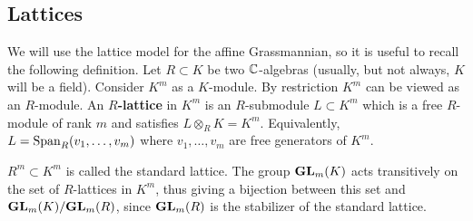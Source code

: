 \documentclass[draft]{article}
\begin{document}
\subsection{Lattices}
\label{ss:lat}
We will use the lattice model for the affine Grassmannian, so it is useful to recall the following definition. Let $ R \subset K$ be two $\mathbb C$-algebras (usually, but not always, $K$ will be a field). 
Consider $ K^m $ as a $K$-module. 
By restriction $ K^m$ can be viewed as an $R$-module.  An \textbf{$R$-lattice} in $K^m$ 
is an $R$-submodule $ L \subset K^m$ 
which is a free $R$-module of rank $ m $ and satisfies $ L \otimes_R K = K^m $. Equivalently, $ L = \operatorname{Span}_R(v_1, \dots, v_m)$ where $v_1, \dots, v_m$ are free generators of $K^m$. 
% 
\begin{comment}
\jcom{Maybe need that both $K$ and $R$ are integral domains and have the same field of fractions?} 
\acom{Roger has proved that what is written is ok.}
\rcom{Here's my argument: If $L \subset K^m$ is a free rank $m$ $R$-module and $L \otimes K = K^m$, then it's clear we that $L$ is generated by $m$ generators $v_1,\dots,v_m$ over $R$. Since $L\otimes K = K^m$, these also generate $K^m$ over $K$. Then we have a surjective map $K^m \twoheadrightarrow K^m$ given by sending a basis of $K^m$ to the generators $v_1,\dots,v_m$. Since any surjective endomorphism of finite $K$-modules is injective, the $v_1,\dots,v_m$ form a basis. I think the only thing that is needed is that the rings are commutative.}
\jcom{Great.}
\end{comment} 

$ R^m \subset K^m $ is called the standard lattice. 
The group ${\mathbf{GL}}_m(K) $ acts transitively on the set of $R$-lattices in $K^m$, thus giving a bijection between 
this set and ${\mathbf{GL}}_m(K)/{\mathbf{GL}}_m(R)$, since $ {\mathbf{GL}}_m(R) $ is the stabilizer of the standard lattice. 
\end{document}
